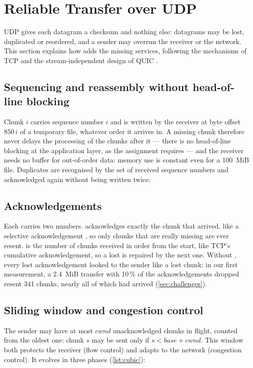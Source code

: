 \section{Reliable Transfer over UDP}\label{sec:reliability}

UDP gives each datagram a checksum and nothing else: datagrams may be lost, duplicated or reordered,
and a sender may overrun the receiver or the network. This section explains how
 adds the missing services, following the mechanisms of TCP
\cite{rfc5681,rfc2018,rfc6298} and the stream-independent design of QUIC \cite{rfc9000}.

\subsection{Sequencing and reassembly without head-of-line blocking}
Chunk $i$ carries sequence number $i$ and is written by the receiver at byte offset $850\,i$ of a
temporary  file, whatever order it arrives in. A missing chunk therefore never delays the
processing of the chunks after it --- there is no head-of-line blocking at the application layer, as
the assignment requires --- and the receiver needs no buffer for out-of-order data: memory use is
constant even for a \SI{100}{MiB} file. Duplicates are recognised by the set of received sequence
numbers and acknowledged again without being written twice.


\subsection{Acknowledgements}
Each  carries two numbers.  acknowledges exactly the chunk that arrived, like a
selective acknowledgement \cite{rfc2018}, so only chunks that are really missing are ever resent.
 is the number of chunks received in order from the start, like TCP's cumulative
acknowledgement, so a lost  is repaired by the next one. Without , every lost
acknowledgement looked to the sender like a lost chunk: in our first measurement, a \SI{2.4}{MiB}
transfer with 10\,\% of the acknowledgements dropped resent 341 chunks, nearly all of which had
arrived (\cref{sec:challenges}).

\subsection{Sliding window and congestion control}
The sender may have at most $\textit{cwnd}$ unacknowledged chunks in flight, counted from the oldest
one: chunk $s$ may be sent only if $s < \textit{base} + \textit{cwnd}$. This window both protects the
receiver (flow control) and adapts to the network (congestion control). It evolves in three phases
(\cref{lst:cubic}):

